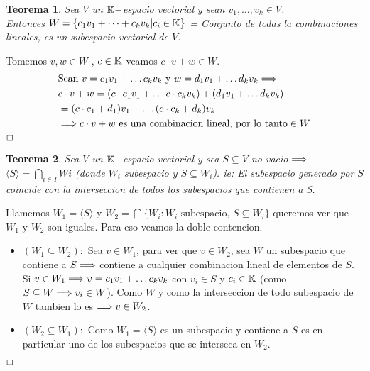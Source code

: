 \documentclass[]{article}
\newtheorem{theorem}{Teorema}
\newenvironment{proof}{\noindent{\bf Prueba:}}{$\hfill \Box$ \vspace{10pt}}
\begin{document}
\begin{theorem}
    Sea $V$ un $\mathbb{K}-$espacio vectorial y sean $v_1, \dots , v_k \in V$.\\
    Entonces $W=\{ c_1v_1+ \dots + c_kv_k | c_i \in \mathbb{K}\}$ = Conjunto de todas la combinaciones lineales,
    es un subespacio vectorial de $V$.
\end{theorem}
\begin{proof}
    Tomemos $v,w \in W$ , $c \in \mathbb{K}$ veamos $c \cdot v + w \in W$.
    \begin{align*}
        &\text{Sean } v= c_1v_1+ \dots c_kv_k \text{ y } w = d_1v_1 + \dots d_kv_k \Longrightarrow \\
        &c \cdot v + w = (c \cdot c_1v_1+ \dots c \cdot c_kv_k) + (d_1v_1 + \dots d_kv_k)\\
        &= (c \cdot c_1 + d_1)v_1 + \dots (c \cdot c_k + d_k)v_k \\
        &\Longrightarrow c \cdot v + w \text{ es una combinacion lineal, por lo tanto} \in W
    \end{align*}
\end{proof}

\begin{theorem}
    Sea $V$ un $\mathbb{K}-$espacio vectorial y sea $S \subseteq V$ no vacio $\Longrightarrow$\\
    $\langle S \rangle = \bigcap_{i \in I} Wi$ (donde $W_i$ subespacio y $S \subseteq W_i$). ie:
    El subespacio generado por $S$ coincide con la interseccion de todos los subespacios que contienen a S.
\end{theorem}
\newpage
\begin{proof}
    Llamemos $W_1= \langle S \rangle$ y $W_2= \bigcap \{ W_i : W_i \text{ subespacio, }  S \subseteq W_i\}$
    queremos ver que $W_1$ y  $W_2$ son iguales. Para eso veamos la doble contencion.
    \begin{itemize}
        \item $(W_1 \subseteq W_2):$ Sea $v \in W_1$, para ver que $v \in W_2$, sea $W$ un subespacio que contiene a
        $S \Longrightarrow$ contiene a cualquier combinacion lineal de elementos de $S$.\\
        Si $v \in W_1 \Longrightarrow v= c_1v_1 + \dots c_kv_k$ con $v_i \in S$ y $c_i \in \mathbb{K}$ (como $S \subseteq W \Longrightarrow v_i \in W$).
        Como $W$ y como la interseccion de todo subespacio de $W$ tambien lo es $\Longrightarrow v \in W_2$.
        \item $(W_2 \subseteq W_1):$ Como $W_1= \langle S \rangle$ es un subespacio y contiene a $S$ es en particular uno
        de los subespacios que se interseca en $W_2$.
    \end{itemize}
\end{proof}
\end{document}
